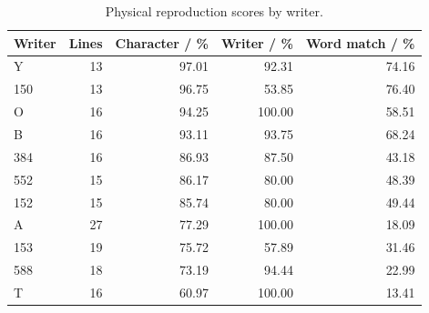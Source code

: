 \begin{table}[!htbp]\centering\small
\begin{tabular}{lrrrr}\toprule
\textbf{Writer} & \textbf{Lines} & \textbf{Character / \%} & \textbf{Writer / \%} & \textbf{Word match / \%}\\\midrule
Y & 13 & 97.01 & 92.31 & 74.16\\
150 & 13 & 96.75 & 53.85 & 76.40\\
O & 16 & 94.25 & 100.00 & 58.51\\
B & 16 & 93.11 & 93.75 & 68.24\\
384 & 16 & 86.93 & 87.50 & 43.18\\
552 & 15 & 86.17 & 80.00 & 48.39\\
152 & 15 & 85.74 & 80.00 & 49.44\\
A & 27 & 77.29 & 100.00 & 18.09\\
153 & 19 & 75.72 & 57.89 & 31.46\\
588 & 18 & 73.19 & 94.44 & 22.99\\
T & 16 & 60.97 & 100.00 & 13.41\\
\bottomrule\end{tabular}
\caption{Physical reproduction scores by writer.}\label{tab:app-r1-writers}
\end{table}
